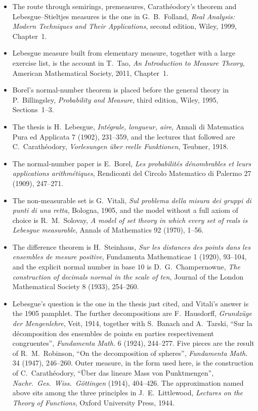 \begin{itemize}
\item The route through semirings, premeasures, Carath\'eodory's theorem and Lebesgue--Stieltjes measures is the one in G.~B.~Folland, \emph{Real Analysis: Modern Techniques and Their Applications}, second edition, Wiley, 1999, Chapter~1.
\item Lebesgue measure built from elementary measure, together with a large exercise list, is the account in T.~Tao, \emph{An Introduction to Measure Theory}, American Mathematical Society, 2011, Chapter~1.
\item Borel's normal-number theorem is placed before the general theory in P.~Billingsley, \emph{Probability and Measure}, third edition, Wiley, 1995, Sections~1--3.
\item The thesis is H.~Lebesgue, \emph{Int\'egrale, longueur, aire}, Annali di Matematica Pura ed Applicata 7 (1902), 231--359, and the lectures that followed are C.~Carath\'eodory, \emph{Vorlesungen \"uber reelle Funktionen}, Teubner, 1918.
\item The normal-number paper is E.~Borel, \emph{Les probabilit\'es d\'enombrables et leurs applications arithm\'etiques}, Rendiconti del Circolo Matematico di Palermo 27 (1909), 247--271.
\item The non-measurable set is G.~Vitali, \emph{Sul problema della misura dei gruppi di punti di una retta}, Bologna, 1905, and the model without a full axiom of choice is R.~M.~Solovay, \emph{A model of set theory in which every set of reals is Lebesgue measurable}, Annals of Mathematics 92 (1970), 1--56.
\item The difference theorem is H.~Steinhaus, \emph{Sur les distances des points dans les ensembles de mesure positive}, Fundamenta Mathematicae 1 (1920), 93--104, and the explicit normal number in base $10$ is D.~G.~Champernowne, \emph{The construction of decimals normal in the scale of ten}, Journal of the London Mathematical Society 8 (1933), 254--260.
\item Lebesgue's question is the one in the thesis just cited, and Vitali's answer is the 1905 pamphlet.
The further decompositions are F.~Hausdorff, \emph{Grundz\"uge der Mengenlehre}, Veit, 1914, together with S.~Banach and A.~Tarski, ``Sur la d\'ecomposition des ensembles de points en parties respectivement congruentes'', \emph{Fundamenta Math.} 6 (1924), 244--277.
Five pieces are the result of R.~M.~Robinson, ``On the decomposition of spheres'', \emph{Fundamenta Math.} 34 (1947), 246--260.
Outer measure, in the form used here, is the construction of C.~Carath\'eodory, ``\"Uber das lineare Mass von Punktmengen'', \emph{Nachr.\ Ges.\ Wiss.\ G\"ottingen} (1914), 404--426.
The approximation named above sits among the three principles in J.~E.~Littlewood, \emph{Lectures on the Theory of Functions}, Oxford University Press, 1944.
\end{itemize}
